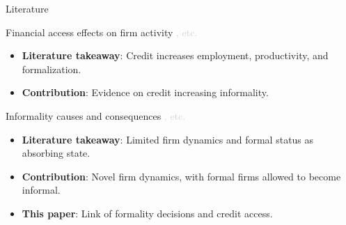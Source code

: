 \documentclass[aspectratio=169]{beamer}
\begin{document}
\begin{frame}[noframenumbering]{Literature}\label{literature}

Financial access effects on firm activity \textcolor{lightgray}{\citep{amiti2018much,greenstone2020credit,gutierrez2023credit,khwaja2008tracing,chodorow2014employment}, etc.}
 \begin{itemize}
    \item \textbf{Literature takeaway}: Credit increases employment, productivity, and formalization.
    \item \textbf{Contribution}: Evidence on credit increasing informality.
 \end{itemize}

\vspace{10mm}

Informality causes and consequences \textcolor{lightgray}{\citep{ulyssea2018firms,meghir2015wages,la2014informality,almeida2012enforcement,busso2012formal,adom2025structural}, etc.}
\begin{itemize}
    \item \textbf{Literature takeaway}: Limited firm dynamics and formal status as absorbing state.
     \item \textbf{Contribution}: Novel firm dynamics, with formal firms allowed to become informal.
 \end{itemize}

\vspace{10mm}

\begin{itemize}
    \item[$\Rightarrow$] \Large \textbf{This paper}: Link of formality decisions and credit access. 
\end{itemize}

\hyperlink{this_paper}{}


\end{frame}

\end{document}
